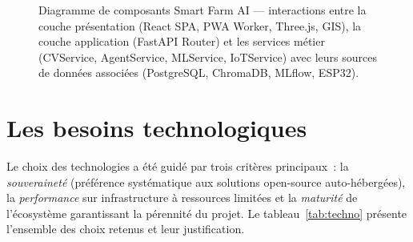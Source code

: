 \begin{figure}[H]
{
}%
\caption{Diagramme de composants Smart Farm AI --- interactions entre la couche présentation
(React SPA, PWA Worker, Three.js, GIS), la couche application (FastAPI Router)
et les services métier (CVService, AgentService, MLService, IoTService) avec leurs
sources de données associées (PostgreSQL, ChromaDB, MLflow, ESP32).}
\label{fig:composants}
\end{figure}

\section{Les besoins technologiques}

Le choix des technologies a été guidé par trois critères principaux~: la
\textit{souveraineté} (préférence systématique aux solutions open-source
auto-hébergées), la \textit{performance} sur infrastructure à ressources limitées
et la \textit{maturité} de l'écosystème garantissant la pérennité du projet.
Le tableau~\ref{tab:techno} présente l'ensemble des choix retenus et leur justification.

